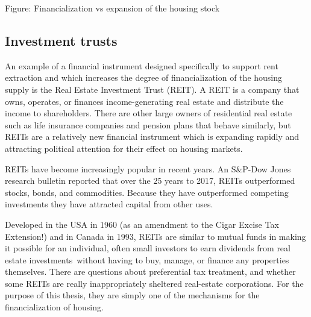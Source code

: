 Figure: Financialization vs expansion of the housing stock 

\subsection{Investment trusts}

An example of a financial instrument designed specifically to support rent extraction and which  increases the degree of financialization of the housing supply is the  Real Estate Investment Trust (REIT).  A REIT is a company that owns, operates, or finances income-generating real estate and distribute the income to shareholders. There are other large owners of residential real estate such as life insurance companies and pension plans that behave similarly, but REITs are a relatively new financial instrument which is  expanding rapidly and attracting political attention for their effect on housing markets.  %

REITs have become increasingly popular in recent years.  An S\&P-Dow Jones research bulletin reported that over the  25 years to 2017, REITs outperformed stocks, bonds, and commodities. Because they have outperformed competing investments they have attracted  capital from other uses.

Developed in the USA  in 1960 (as an amendment to the Cigar Excise Tax Extension!) and in Canada in 1993, REITs are similar to mutual funds in making it possible for an individual, often small investors to earn dividends from real estate investments without having to buy, manage, or finance any properties themselves. There are questions about preferential tax treatment, and whether some REITs are really inappropriately sheltered real-estate corporations.  For the purpose of this thesis, they are simply one of the mechanisms for the financialization of housing.

